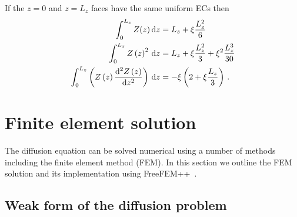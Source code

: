 \documentclass[a4paper]{article}
\numberwithin{equation}{section}
\begin{document}
If the $z=0$ and $z=L_z$ faces have the same uniform ECs then
\begin{align}
\int_0^{L_z} Z(z)\,\mathrm{d}{z} &= L_z+\xi\frac{L_z^2}{6} \\
\int_0^{L_z} Z\left(z\right)^2\,\mathrm{d}{z} &= L_z+\xi\frac{L_z^2}{3}+\xi^2\frac{L_z^3}{30} \\
\int_0^{L_z} \left(Z\left(z\right)\frac{\mathrm{d}^2Z\left(z\right)}{\mathrm{d} z^2}\right)\,\mathrm{d}{z} &=-\xi\left(2+\xi \frac{L_z} 3\right)\,.
\end{align}


\section[Finite element solution]{Finite element solution}
\label{sc:fem}

The diffusion equation can be solved numerical using a number of methods
including the finite element method (FEM). In this section we outline the FEM 
solution and its implementation using FreeFEM++~\citep{Hecht2013,Hecht2017}.

\subsection[Weak form of the diffusion problem]{Weak form of the diffusion problem}
\label{sc:fem:weak}
\end{document}
